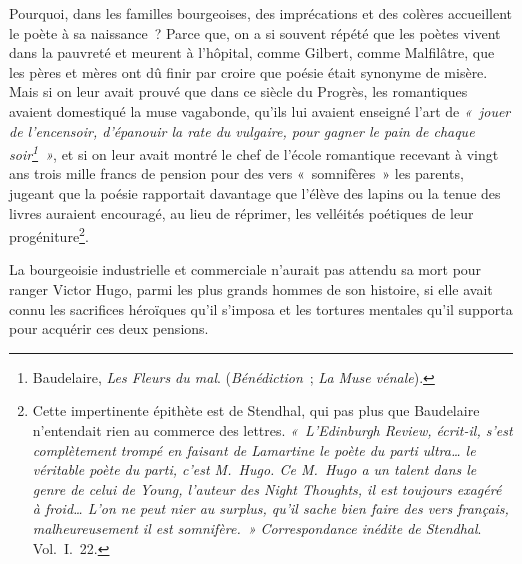 \documentclass[french,twoside]{book} %
\begin{document}
\noindent Pourquoi, dans les familles bourgeoises, des imprécations et des colères accueillent le poète à sa naissance ? Parce que, on a si souvent répété que les poètes vivent dans la pauvreté et meurent à l’hôpital, comme Gilbert, comme Malfilâtre, que les pères et mères ont dû finir par croire que poésie était synonyme de misère. Mais si on leur avait prouvé que dans ce siècle du Progrès, les romantiques  
\label{p15}avaient domestiqué la muse vagabonde, qu’ils lui avaient enseigné l’art de \emph{« jouer de l’encensoir, d’épanouir la rate du vulgaire, pour gagner le pain de chaque soir\footnote{Baudelaire, \emph{Les Fleurs du mal}. (\emph{Bénédiction} ; \emph{La Muse vénale}).} »}, et si on leur avait montré le chef de l’école romantique recevant à vingt ans trois mille francs de pension pour des vers « somnifères » les parents, jugeant que la poésie rapportait davantage que l’élève des lapins ou la tenue des livres auraient encouragé, au lieu de réprimer, les velléités poétiques de leur progéniture\footnote{Cette impertinente épithète est de Stendhal, qui pas plus que Baudelaire n’entendait rien au commerce des lettres. \emph{« L’\emph{Edinburgh Review}, écrit-il, s’est complètement trompé en faisant de Lamartine le poète du parti {\itshape ultra}… le véritable poète du parti, c’est M. Hugo. Ce M. Hugo a un talent dans le genre de celui de Young, l’auteur des \emph{Night Thoughts}, il est toujours exagéré à froid… L’on ne peut nier au surplus, qu’il sache bien faire des vers français, malheureusement il est somnifère. »} \emph{Correspondance inédite de Stendhal}. Vol. I. 22.}.\par
La bourgeoisie industrielle et commerciale n’aurait pas attendu sa mort pour ranger Victor Hugo, parmi les plus grands hommes de son histoire, si elle avait connu les sacrifices héroïques qu’il s’imposa et les tortures mentales qu’il supporta pour acquérir ces deux pensions.
\end{document}
